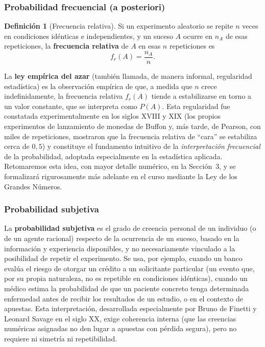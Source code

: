 \documentclass[11pt,a4paper]{article}
\theoremstyle{plain}
\theoremstyle{definition}
\newtheorem{definicion}[teorema]{Definición}
\theoremstyle{remark}
\begin{document}
\subsubsection{Probabilidad frecuencial (a posteriori)}

\begin{definicion}[Frecuencia relativa]
Si un experimento aleatorio se repite $n$ veces en condiciones idénticas e independientes, y un suceso $A$ ocurre en $n_A$ de esas repeticiones, la \textbf{frecuencia relativa} de $A$ en esas $n$ repeticiones es
\[
f_r(A) = \frac{n_A}{n}.
\]
\end{definicion}

La \textbf{ley empírica del azar} (también llamada, de manera informal, regularidad estadística) es la observación empírica de que, a medida que $n$ crece indefinidamente, la frecuencia relativa $f_r(A)$ tiende a estabilizarse en torno a un valor constante, que se interpreta como $P(A)$. Esta regularidad fue constatada experimentalmente en los siglos XVIII y XIX (los propios experimentos de lanzamiento de monedas de Buffon y, más tarde, de Pearson, con miles de repeticiones, mostraron que la frecuencia relativa de ``cara'' se estabiliza cerca de $0{,}5$) y constituye el fundamento intuitivo de la \emph{interpretación frecuencial} de la probabilidad, adoptada especialmente en la estadística aplicada. Retomaremos esta idea, con mayor detalle numérico, en la Sección~3, y se formalizará rigurosamente más adelante en el curso mediante la Ley de los Grandes Números.

\subsubsection{Probabilidad subjetiva}

La \textbf{probabilidad subjetiva} es el grado de creencia personal de un individuo (o de un agente racional) respecto de la ocurrencia de un suceso, basado en la información y experiencia disponibles, y no necesariamente vinculado a la posibilidad de repetir el experimento. Se usa, por ejemplo, cuando un banco evalúa el riesgo de otorgar un crédito a un solicitante particular (un evento que, por su propia naturaleza, no es repetible en condiciones idénticas), cuando un médico estima la probabilidad de que un paciente concreto tenga determinada enfermedad antes de recibir los resultados de un estudio, o en el contexto de apuestas. Esta interpretación, desarrollada especialmente por Bruno de Finetti y Leonard Savage en el siglo XX, exige coherencia interna (que las creencias numéricas asignadas no den lugar a apuestas con pérdida segura), pero no requiere ni simetría ni repetibilidad.
\end{document}
